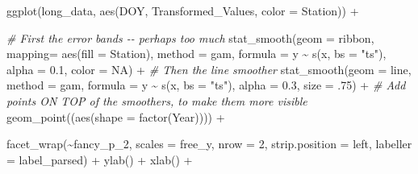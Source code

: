 \documentclass[
]{article}
\newenvironment{Shaded}{\begin{snugshade}}{\end{snugshade}}
\newcommand{\AttributeTok}[1]{\textcolor[rgb]{0.77,0.63,0.00}{#1}}
\newcommand{\CommentTok}[1]{\textcolor[rgb]{0.56,0.35,0.01}{\textit{#1}}}
\newcommand{\ConstantTok}[1]{\textcolor[rgb]{0.00,0.00,0.00}{#1}}
\newcommand{\DecValTok}[1]{\textcolor[rgb]{0.00,0.00,0.81}{#1}}
\newcommand{\FloatTok}[1]{\textcolor[rgb]{0.00,0.00,0.81}{#1}}
\newcommand{\FunctionTok}[1]{\textcolor[rgb]{0.00,0.00,0.00}{#1}}
\newcommand{\NormalTok}[1]{#1}
\newcommand{\SpecialCharTok}[1]{\textcolor[rgb]{0.00,0.00,0.00}{#1}}
\newcommand{\StringTok}[1]{\textcolor[rgb]{0.31,0.60,0.02}{#1}}
\begin{document}
\begin{Shaded}
\begin{Highlighting}[]
\FunctionTok{ggplot}\NormalTok{(long\_data, }\FunctionTok{aes}\NormalTok{(DOY, Transformed\_Values, }\AttributeTok{color =}\NormalTok{ Station)) }\SpecialCharTok{+}

  \CommentTok{\# First the error bands {-}{-} perhaps too much }
  \FunctionTok{stat\_smooth}\NormalTok{(}\AttributeTok{geom =} \StringTok{\textquotesingle{}ribbon\textquotesingle{}}\NormalTok{,}
              \AttributeTok{mapping=} \FunctionTok{aes}\NormalTok{(}\AttributeTok{fill =}\NormalTok{ Station),}
              \AttributeTok{method =} \StringTok{\textquotesingle{}gam\textquotesingle{}}\NormalTok{,}
              \AttributeTok{formula =}\NormalTok{ y }\SpecialCharTok{\textasciitilde{}} \FunctionTok{s}\NormalTok{(x, }\AttributeTok{bs =} \StringTok{"ts"}\NormalTok{),}
              \AttributeTok{alpha =} \FloatTok{0.1}\NormalTok{,}
              \AttributeTok{color =} \ConstantTok{NA}\NormalTok{) }\SpecialCharTok{+}
  \CommentTok{\# Then the line smoother}
  \FunctionTok{stat\_smooth}\NormalTok{(}\AttributeTok{geom =} \StringTok{\textquotesingle{}line\textquotesingle{}}\NormalTok{,}
              \AttributeTok{method =} \StringTok{\textquotesingle{}gam\textquotesingle{}}\NormalTok{,}
              \AttributeTok{formula =}\NormalTok{ y }\SpecialCharTok{\textasciitilde{}} \FunctionTok{s}\NormalTok{(x, }\AttributeTok{bs =} \StringTok{"ts"}\NormalTok{),}
              \AttributeTok{alpha =} \FloatTok{0.3}\NormalTok{,}
              \AttributeTok{size =}\NormalTok{ .}\DecValTok{75}\NormalTok{) }\SpecialCharTok{+}
  \CommentTok{\# Add points ON TOP of the smoothers, to make them more visible}
  \FunctionTok{geom\_point}\NormalTok{((}\FunctionTok{aes}\NormalTok{(}\AttributeTok{shape =} \FunctionTok{factor}\NormalTok{(Year)))) }\SpecialCharTok{+}

  \FunctionTok{facet\_wrap}\NormalTok{(}\SpecialCharTok{\textasciitilde{}}\NormalTok{fancy\_p\_2, }
             \AttributeTok{scales =} \StringTok{\textquotesingle{}free\_y\textquotesingle{}}\NormalTok{, }
             \AttributeTok{nrow =} \DecValTok{2}\NormalTok{,}
             \AttributeTok{strip.position =} \StringTok{\textquotesingle{}left\textquotesingle{}}\NormalTok{,}
             \AttributeTok{labeller =}\NormalTok{ label\_parsed) }\SpecialCharTok{+}
  \FunctionTok{ylab}\NormalTok{(}\StringTok{\textquotesingle{}\textquotesingle{}}\NormalTok{) }\SpecialCharTok{+}
  \FunctionTok{xlab}\NormalTok{(}\StringTok{\textquotesingle{}\textquotesingle{}}\NormalTok{) }\SpecialCharTok{+}
  

\end{Highlighting}
\end{Shaded}
\end{document}
